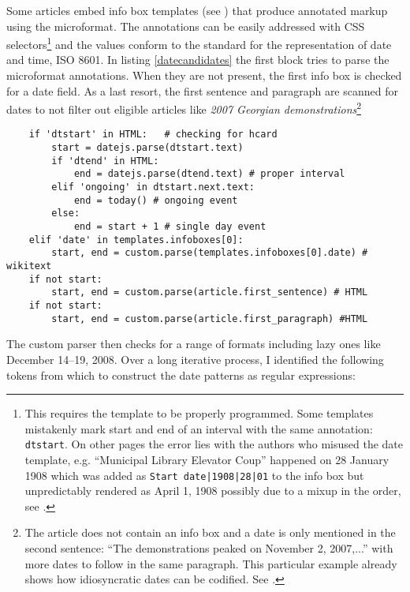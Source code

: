 Some articles embed info box templates (see ) that produce annotated markup using the  microformat.
The annotations can be easily addressed with CSS selectors\footnote{This requires the template to be properly programmed. Some templates mistakenly mark start and end of an interval with the same annotation: \verb"dtstart". On other pages the error lies with the authors who misused the date template, e.g. ``Municipal Library Elevator Coup'' happened on 28 January 1908 which was added as  \verb"Start date|1908|28|01" to the info box but unpredictably rendered as April 1, 1908 possibly due to a mixup in the order, see .} and the values conform to the standard for the representation of date and time, ISO 8601.
In listing \ref{datecandidates} the first block tries to parse the microformat annotations.
When they are not present, the first info box is checked for a date field.
As a last resort, the first sentence and paragraph are scanned for dates to not filter out eligible articles like \emph{2007 Georgian demonstrations}\footnote{The article does not contain an info box and a date is only mentioned in the second sentence: ``The demonstrations peaked on November 2, 2007,...'' with more dates to follow in the same paragraph. This particular example already shows how idiosyncratic dates can be codified. See .}

\begin{lstlisting}
	if 'dtstart' in HTML:	# checking for hcard
		start = datejs.parse(dtstart.text)
		if 'dtend' in HTML:
			end = datejs.parse(dtend.text) # proper interval
		elif 'ongoing' in dtstart.next.text:
			end = today() # ongoing event
		else:
			end = start + 1 # single day event
	elif 'date' in templates.infoboxes[0]:
		start, end = custom.parse(templates.infoboxes[0].date) # wikitext
	if not start:
		start, end = custom.parse(article.first_sentence) # HTML
	if not start:
		start, end = custom.parse(article.first_paragraph) #HTML
\end{lstlisting}

The custom parser then checks for a range of formats including lazy ones like December 14--19, 2008.
Over a long iterative process, I identified the following tokens from which to construct the date patterns as regular expressions:

